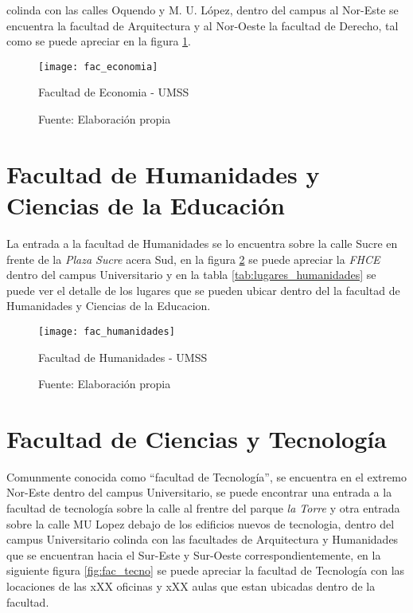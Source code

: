       colinda con las calles Oquendo y M. U. López, dentro del campus al Nor-Este se encuentra la facultad de Arquitectura y al Nor-Oeste la facultad de Derecho, tal como se puede apreciar en la figura \ref{fig:fac_economia}.

      \begin{figure}[H]
       \begin{center}
         \texttt{[image: fac\_economia]}
         \caption{Facultad de Economia - UMSS}
         \label{fig:fac_economia}
         \caption*{Fuente: Elaboración propia}
       \end{center}
      \end{figure}






\section{Facultad de Humanidades y Ciencias de la Educación}
\label{sec:facultad_humanidades}

La entrada a la facultad de Humanidades se lo encuentra sobre la calle Sucre en frente de la \emph{Plaza Sucre} acera Sud, en la figura \ref{fig:fac_humanidades} se puede apreciar la \emph{FHCE} dentro del campus Universitario y en la tabla \ref{tab:lugares_humanidades} se puede ver el detalle de los lugares que se pueden ubicar dentro del la facultad de Humanidades y Ciencias de la Educacion.

\begin{figure}[H]
 \begin{center}
   \texttt{[image: fac\_humanidades]}
   \caption{Facultad de Humanidades - UMSS}
   \label{fig:fac_humanidades}
   \caption*{Fuente: Elaboración propia}
 \end{center}
\end{figure}




\section{Facultad de Ciencias y Tecnología}
\label{sec:facultad_tecnologia}

Comunmente conocida como ``facultad de Tecnología'',  se encuentra en el extremo Nor-Este dentro del campus Universitario, se puede encontrar una entrada a la facultad de tecnología sobre la calle  al frentre del parque \emph{la Torre} y otra entrada sobre la calle MU Lopez debajo de los edificios nuevos de tecnologia, dentro del campus Universitario colinda con las facultades de Arquitectura y Humanidades que se encuentran hacia el Sur-Este y Sur-Oeste correspondientemente, en la siguiente figura \ref{fig:fac_tecno} se puede apreciar la facultad de Tecnología con las locaciones de las xXX oficinas y xXX aulas que estan ubicadas dentro de la facultad.

